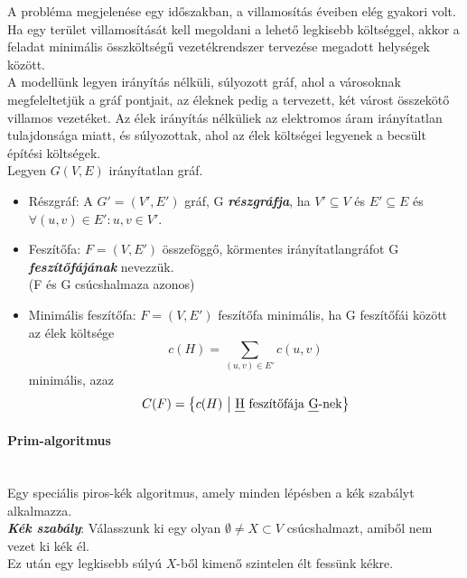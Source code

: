 \documentclass[margin=0px]{article}
\begin{document}
    \noindent A probléma megjelenése egy időszakban, a villamosítás éveiben elég gyakori volt. Ha egy terület villamosítását kell megoldani a lehető legkisebb költséggel, akkor a feladat minimális összköltségű vezetékrendszer tervezése megadott helységek között.\\

    \noindent A modellünk legyen irányítás nélküli, súlyozott gráf, ahol a városoknak megfeleltetjük a gráf pontjait, az éleknek pedig a tervezett, két várost összekötő villamos vezetéket. Az élek irányítás nélküliek az elektromos áram irányítatlan tulajdonsága miatt, és súlyozottak, ahol az élek költségei legyenek a becsült építési költségek.\\
    
    \noindent Legyen $G(V, E)$ irányítatlan gráf.
    \begin{itemize}
        \item Részgráf: A $G' = (V', E')$ gráf, G \textbf{\emph{részgráfja}}, ha $V' \subseteq V$ és $E' \subseteq E$ és $\forall (u, v) \in E': u, v \in V'$.
        \item Feszítőfa: $F = (V, E')$ összeföggő, körmentes irányítatlangráfot G \textbf{\emph{feszítőfájának}} nevezzük.\\
        (F és G csúcshalmaza azonos)
        \item Minimális feszítőfa: $F = (V, E')$ feszítőfa minimális, ha G feszítőfái között az élek költsége 
        \[c(H) = \sum\limits_{(u,v) \in E'}c(u,v)\] 
        minimális, azaz
        \[
            C(F) = \left\{c(H)\ \big|\ \text{\emph{H} feszítőfája \emph{G}-nek}\right\}
        \]
    \end{itemize}

    \paragraph*{Prim-algoritmus\\\\}

    \noindent Egy speciális piros-kék algoritmus, amely minden lépésben a kék szabályt alkalmazza.\\
    
    \noindent \textbf{\emph{Kék szabály}}: Válasszunk ki egy olyan $\emptyset \neq X \subset V$ csúcshalmazt, amiből nem vezet ki kék él. \\
    Ez után egy legkisebb súlyú $X$-ből kimenő szintelen élt fessünk kékre.\\
\end{document}
